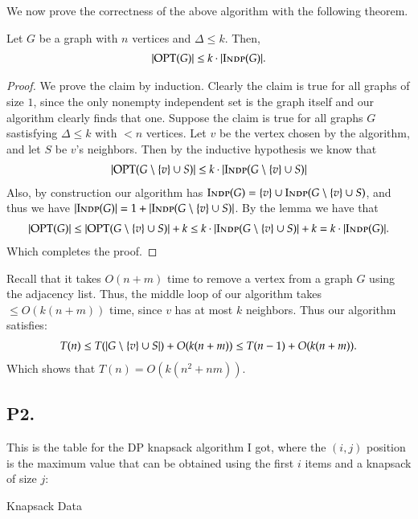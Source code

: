 \documentclass[12pt]{article}
\newenvironment{theorem}{\begin{mytheorem}}{\end{mytheorem}}
\theoremstyle{definitionstyle}
\newcommand{\SET}[1]{\Set{\mskip-\medmuskip #1 \mskip-\medmuskip}}
\newcommand{\OPT}{\mathrm{OPT}}
\newcommand{\Indp}{\textsc{Indp}}
\begin{document}
    We now prove the correctness of the above algorithm with the following theorem.
    \begin{theorem}
        Let $G$ be a graph with $n$ vertices and $\Delta \leq k$. Then,
        \begin{align*}
            |\OPT(G)| \leq k \cdot |\Indp(G)|.
        \end{align*}
    \end{theorem}
    \begin{proof}
        We prove the claim by induction. Clearly the claim is true for all graphs of size $1$, since the only nonempty independent set is the graph itself and our algorithm clearly finds that one. Suppose the claim is true for all graphs $G$ sastisfying $\Delta \leq k$ with $<n$ vertices. Let $v$ be the vertex chosen by the algorithm, and let $S$ be $v$'s neighbors. Then by the inductive hypothesis we know that 
        \begin{align*}
            |\OPT(G \setminus \SET{v} \cup S)| \leq k \cdot |\Indp(G \setminus \SET{v} \cup S)|
        \end{align*}
        Also, by construction our algorithm has $\Indp(G) = \SET{v} \cup \Indp(G \setminus \SET{v} \cup S)$, and thus we have $|\Indp(G)| = 1 + |\Indp(G \setminus \SET{v} \cup S)|$. By the lemma we have that
        \begin{align*}
            |\OPT(G)| \leq |\OPT(G \setminus \SET{v} \cup S)| + k \leq k \cdot |\Indp(G \setminus \SET{v} \cup S)| + k = k \cdot |\Indp(G)|.
        \end{align*}
        Which completes the proof.
    \end{proof}
    Recall that it takes $O(n+m)$ time to remove a vertex from a graph $G$ using the adjacency list. Thus, the middle loop of our algorithm takes $\leq O(k(n+m))$ time, since $v$ has at most $k$ neighbors. Thus our algorithm satisfies:
    \begin{align*}
        T(n) \leq T(|G \setminus \SET{v} \cup S|) + O(k(n+m)) \leq T(n-1) + O(k(n+m)).
    \end{align*}
    Which shows that $T(n) = O(k(n^2+nm))$.

    \newpage
    \subsection*{P2.}
    This is the table for the DP knapsack algorithm I got, where the $(i,j)$ position is the maximum value that can be obtained using the first $i$ items and a knapsack of size $j$:
    \begin{table}[htbp]
        \centering
        \caption{Knapsack Data}
    \end{table}
\end{document}
